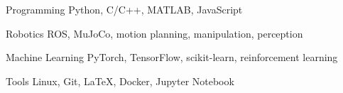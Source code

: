 
\VectraSkillGroup
    {Programming}
    {Python, C/C++, MATLAB, JavaScript}

\VectraSkillGroup
    {Robotics}
    {ROS, MuJoCo, motion planning, manipulation, perception}

\VectraSkillGroup
    {Machine Learning}
    {PyTorch, TensorFlow, scikit-learn, reinforcement learning}

\VectraSkillGroup
    {Tools}
    {Linux, Git, LaTeX, Docker, Jupyter Notebook}